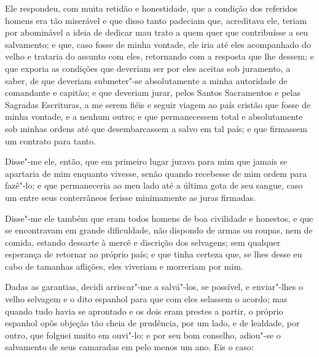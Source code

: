 Ele respondeu, com muita retidão e honestidade, que a condição dos
referidos homens era tão miserável e que disso tanto padeciam que,
acreditava ele, teriam por abominável a ideia de dedicar mau trato a
quem quer que contribuísse a seu salvamento; e que, caso fosse de minha
vontade, ele iria até eles acompanhado do velho e trataria do assunto
com eles, retornando com a resposta que lhe dessem; e que exporia as
condições que deveriam ser por eles aceitas sob juramento, a saber, de
que deveriam submeter"-se absolutamente a minha autoridade de comandante
e capitão; e que deveriam jurar, pelos Santos Sacramentos e pelas
Sagradas Escrituras, a me serem fiéis e seguir viagem ao país cristão
que fosse de minha vontade, e a nenhum outro; e que permanecessem total
e absolutamente sob minhas ordens até que desembarcassem a salvo em tal
país; e que firmassem um contrato para tanto.

Disse"-me ele, então, que em primeiro lugar jurava para mim que jamais se
apartaria de mim enquanto vivesse, senão quando recebesse de mim ordem
para fazê"-lo; e que permaneceria ao meu lado até a última gota de seu
sangue, caso um entre seus conterrâneos ferisse minimamente as juras
firmadas.

Disse"-me ele também que eram todos homens de boa civilidade e honestos,
e que se encontravam em grande dificuldade, não dispondo de armas ou
roupas, nem de comida, estando dessarte à mercê e discrição dos
selvagens; sem qualquer esperança de retornar ao próprio país; e que
tinha certeza que, se lhes desse eu cabo de tamanhas aflições, eles
viveriam e morreriam por mim.

Dadas as garantias, decidi arriscar"-me a salvá"-los, se possível, e
enviar"-lhes o velho selvagem e o dito espanhol para que com eles
selassem o acordo; mas quando tudo havia se aprontado e os dois eram
prestes a partir, o próprio espanhol opôs objeção tão cheia de
prudência, por um lado, e de lealdade, por outro, que folguei muito em
ouvi"-lo; e por seu bom conselho, adiou"-se o salvamento de seus camaradas
em pelo menos um ano. Eis o caso:

